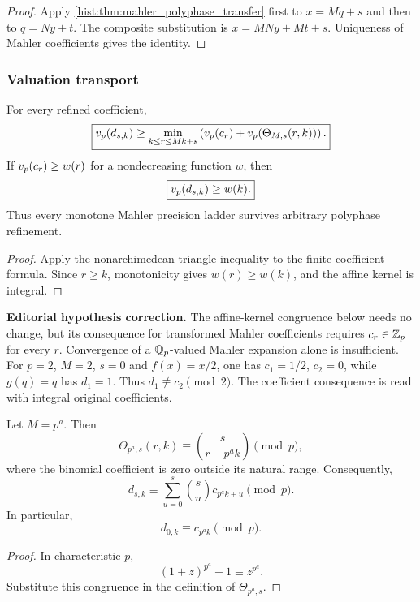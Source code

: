 \begin{proof}
Apply \cref{hist:thm:mahler_polyphase_transfer} first to \(x=Mq+s\) and then to \(q=Ny+t\). The composite substitution is \(x=MNy+Mt+s\). Uniqueness of Mahler coefficients gives the identity.
\end{proof}

\subsubsection{Valuation transport}

\begin{histtheorem}\label{hist:thm:polyphase_valuation_ledger}
For every refined coefficient,
\[
\boxed{
v_p(d_{s,k})
\geq
\min_{k\leq r\leq Mk+s}
\left(
v_p(c_r)+v_p(\Theta_{M,s}(r,k))
\right).
}
\]
If \(v_p(c_r)\geq w(r)\) for a nondecreasing function \(w\), then
\[
\boxed{v_p(d_{s,k})\geq w(k).}
\]
Thus every monotone Mahler precision ladder survives arbitrary polyphase refinement.
\end{histtheorem}

\begin{proof}
Apply the nonarchimedean triangle inequality to the finite coefficient formula. Since \(r\geq k\), monotonicity gives \(w(r)\geq w(k)\), and the affine kernel is integral.
\end{proof}

\begin{histtheorem}\label{hist:thm:prime_power_sparsification}
\par\noindent\textbf{Editorial hypothesis correction.} The affine-kernel congruence below needs no change, but its consequence for transformed Mahler coefficients requires $c_r\in\mathbb Z_p$ for every $r$. Convergence of a $\mathbb Q_p$-valued Mahler expansion alone is insufficient. For $p=2$, $M=2$, $s=0$ and $f(x)=x/2$, one has $c_1=1/2$, $c_2=0$, while $g(q)=q$ has $d_1=1$. Thus $d_1\not\equiv c_2\pmod2$. The coefficient consequence is read with integral original coefficients.\par\medskip
Let \(M=p^a\). Then
\[
\boxed{
\Theta_{p^a,s}(r,k)
\equiv
\binom{s}{r-p^ak}
\pmod p,
}
\]
where the binomial coefficient is zero outside its natural range. Consequently,
\[
\boxed{
d_{s,k}
\equiv
\sum_{u=0}^{s}
\binom su
c_{p^ak+u}
\pmod p.
}
\]
In particular,
\[
\boxed{d_{0,k}\equiv c_{p^ak}\pmod p.}
\]
\end{histtheorem}

\begin{proof}
In characteristic \(p\),
\[
(1+z)^{p^a}-1\equiv z^{p^a}.
\]
Substitute this congruence in the definition of \(\Theta_{p^a,s}\).
\end{proof}


